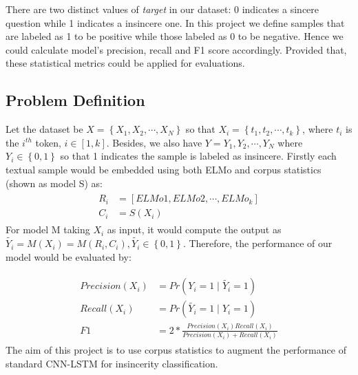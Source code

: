 \documentclass[12pt]{diazessay} %
\begin{document}
There are two distinct values of \textit{target} in our dataset: 0 indicates a sincere question while 1 indicates a insincere one. In this project we define samples that are labeled as 1 to be positive while those labeled as 0 to be negative. Hence we could calculate model's precision, recall and F1 score accordingly. Provided that, these statistical metrics could be applied for evaluations.

\subsection{Problem Definition}

Let the dataset be $X = \left \{ X_1, X_2,\cdots, X_N \right \}$ so that $X_i = \left \{ t_1, t_2,\cdots, t_k \right \}$, where $t_i$ is the $i^{th}$ token, $i\in [1,k]$. Besides, we also have $Y={Y_1, Y_2,\cdots,Y_N}$ where $Y_i\in\left\{ 0, 1 \right\}$ so that 1 indicates the sample is labeled as  insincere. Firstly each textual sample would be embedded using both ELMo and corpus statistics (shown as model S) as:
\begin{align} 
\begin{split}
   R_i &= [ELMo1, ELMo2,\cdots,ELMo_k]\\
   C_i &= S(X_i)
\end{split}         
\end{align}
For model M taking $X_i$ as input, it would compute the output as $\widetilde{Y_i} = M(X_i) = M(R_i, C_i), \widetilde{Y_i} \in \left\{ 0, 1 \right\}$. Therefore, the performance of our model would be evaluated by:

\begin{align} 
\begin{split}
   Precision(X_i) &= Pr(Y_i=1 \mid \widetilde{Y_i}=1) \\
   Recall(X_i) &= Pr(\widetilde{Y_i}=1 \mid Y_i=1) \\ 
   F1 & = 2 * \frac{Precision(X_i) Recall(X_i)}{Precision(X_i) + Recall(X_i)}
\end{split}         
\end{align}
The aim of this project is to use corpus statistics to augment the performance of standard CNN-LSTM for insincerity classification.



\newpage




\end{document}
